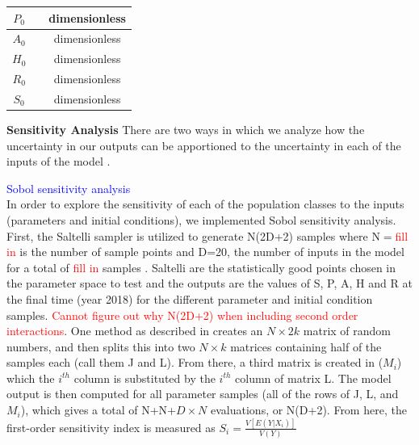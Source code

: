 \documentclass[12pt]{article}
\begin{document}
\begin{center}
\begin{tabular}{|c | c | c|}
$P_0$ &  & \scriptsize{dimensionless} \\

\hline

$A_0$ &  & \scriptsize{dimensionless} \\

\hline

$H_0$ &  & \scriptsize{dimensionless}  \\

\hline

$R_0$ &  & \scriptsize{dimensionless}  \\

\hline

$S_0$ &  & \scriptsize{dimensionless}  \\

\hline


\end{tabular}

\end{center}
 
 \pagebreak


\textbf{Sensitivity Analysis} 
There are two ways in which we analyze how the uncertainty in our outputs can be apportioned to the uncertainty in each of the inputs of the model \cite{Herman, Marino}. 



\textcolor{blue}{Sobol sensitivity analysis} \\
In order to explore the sensitivity of each of the population classes to the inputs (parameters and initial conditions), we implemented Sobol sensitivity analysis. First, the Saltelli sampler is utilized to generate N(2D+2) samples where N$=$\textcolor{red}{fill in} is the number of sample points and D=20, the number of inputs in the model for a total of \textcolor{red}{fill in} samples \cite{Herman}. 
Saltelli are the statistically good points chosen in the parameter space to test and the outputs are the values of S, P, A, H and R at the final time (year 2018) for the different parameter and initial condition samples. 
\textcolor{red}{Cannot figure out why N(2D+2) when including second order interactions}. 
One method as described in \cite{Saltelli1} creates an $N \times 2k$ matrix of random numbers, and then splits this into two $N \times k$ matrices containing half of the samples each (call them J and L). From there, a third matrix is created in ($M_i$) which the $i^{th}$ column is substituted by the $i^{th}$ column of matrix L. The model output is then computed for all parameter samples (all of the rows of J, L, and $M_i$), which gives a total of N+N+$D\times N$ evaluations, or N(D+2). 
From here, the first-order sensitivity index is measured as $S_i=\frac{V[E(Y|X_i)]}{V(Y)}$ 
\end{document}
